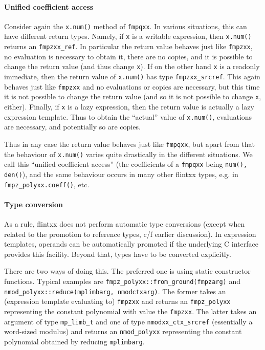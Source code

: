 \documentclass[a4paper,10pt]{book}
\newcommand{\code}{\lstinline}
\begin{document}
{{\paragraph{Unified coefficient access}

Consider again the \code{x.num()} method of \code{fmpqxx}. In various
situations,
this can have different return types. Namely, if \code{x} is a writable
expression, then \code{x.num()} returns an \code{fmpzxx_ref}. In
particular the return value behaves just like \code{fmpzxx}, no evaluation is
necessary to obtain it, there are no copies, and it is possible to change the
return value (and thus change \code{x}). If on the other hand \code{x} is a
readonly immediate,
then the return value of \code{x.num()} has type
\code{fmpzxx_srcref}. This again behaves just like \code{fmpzxx} and no
evaluations or copies are necessary, but this time it is not possible to change
the return value (and so it is not possible to change \code{x}, either).
Finally, if \code{x} is a lazy expression, then
the return value is actually a lazy expression template. Thus to obtain the
``actual'' value of \code{x.num()}, evaluations are necessary, and potentially
so are copies.

Thus in any case the return value behaves just like \code{fmpqxx}, but apart
from that the behaviour of \code{x.num()} varies quite drastically in the
different situations. We call this ``unified coefficient access'' (the
coefficients of a \code{fmpqxx} being \code{num(), den()}), and the same
behaviour occurs in many other flintxx types, e.g. in
\code{fmpz_polyxx.coeff()}, etc.

\paragraph{Type conversion}

As a rule, flintxx does not perform automatic type conversions (except when
related to the promotion to reference types, c/f earlier discussion). In
expression templates, operands can be automatically promoted if the underlying
C interface provides this facility. Beyond that, types have to be converted
explicitly.

There are two ways of doing this. The preferred one is using static constructor
functions. Typical examples are
\code{fmpz_polyxx::from_ground(fmpzarg)} and\\
\code{nmod_polyxx::reduce(mplimbarg, nmodctxarg)}. The former takes an
(expression template evaluating to) \code{fmpzxx} and returns an
\code{fmpz_polyxx} representing the constant polynomial with value the
\code{fmpzxx}. The latter takes an argument of type \code{mp_limb_t} and one of
type \code{nmodxx_ctx_srcref} (essentially a word-sized modulus) and returns an
\code{nmod_polyxx} representing the constant polynomial obtained by reducing
\code{mplimbarg}.

}}
\end{document}
